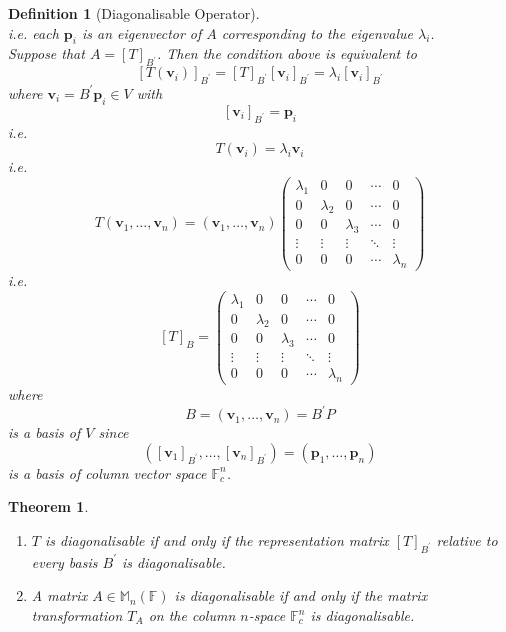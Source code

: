 \documentclass[12pt]{article}
\newtheorem{definition}{Definition}[section]
\newtheorem{theorem}{Theorem}[section]
\theoremstyle{definition}
\begin{document}
\begin{definition}[Diagonalisable Operator]
\[\]
i.e. each $\mathbf{p}_i$ is an eigenvector of $A$ corresponding to the eigenvalue $\lambda_i$.\\
Suppose that $A=[T]_{B^\prime}$. Then the condition above is equivalent to 
\[
[T(\mathbf{v}_i)]_{B^\prime} = [T]_{B^\prime}[\mathbf{v}_i]_{B^\prime} = \lambda_i[\mathbf{v}_i]_{B^\prime}
\]
where $\mathbf{v}_i=B^\prime \mathbf{p}_i\in V$ with
\[
[\mathbf{v}_i]_{B^\prime} = \mathbf{p}_i
\]
i.e. 
\[
T(\mathbf{v}_i)=\lambda_i\mathbf{v}_i
\]
i.e. 
\[
T(\mathbf{v}_1,\ldots,\mathbf{v}_n)=(\mathbf{v}_1,\ldots,\mathbf{v}_n)\begin{pmatrix}
\lambda_1&0&0&\cdots&0\\
0&\lambda_2&0&\cdots&0\\
0&0&\lambda_3&\cdots&0\\
\vdots&\vdots&\vdots&\ddots&\vdots\\
0&0&0&\cdots&\lambda_n
\end{pmatrix}
\]
i.e. 
\[
[T]_B=\begin{pmatrix}
\lambda_1&0&0&\cdots&0\\
0&\lambda_2&0&\cdots&0\\
0&0&\lambda_3&\cdots&0\\
\vdots&\vdots&\vdots&\ddots&\vdots\\
0&0&0&\cdots&\lambda_n
\end{pmatrix}
\]
where
\[
B=(\mathbf{v}_1,\ldots,\mathbf{v}_n)=B^\prime P
\]
is a basis of $V$ since
\[
([\mathbf{v}_1]_{B^\prime},\ldots,[\mathbf{v}_n]_{B^\prime}) = (\mathbf{p}_1,\ldots,\mathbf{p}_n)
\]
is a basis of column vector space $\mathbb{F}_c^n$.
\end{definition}
\begin{theorem}
\hfill\\\normalfont
\begin{enumerate}[label=(\arabic*)]
\item $T$ is diagonalisable if and only if the representation matrix $[T]_{B^\prime}$ relative to every basis $B^\prime$ is diagonalisable.
\item A matrix $A\in\mathbb{M}_n(\mathbb{F})$ is diagonalisable if and only if the matrix transformation $T_A$ on the column $n$-space $\mathbb{F}_c^n$ is diagonalisable.
\end{enumerate}
\end{theorem}
\end{document}
